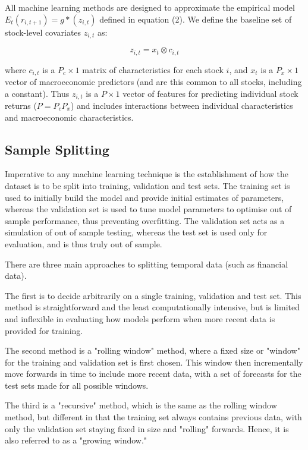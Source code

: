 \documentclass[a4paper, table]{article}
\newcommand{\smalltodo}[2][] {\todo[caption={#2}, size=\scriptsize,%
	fancyline,#1]{\begin{spacing}{.5}#2\end{spacing}}}
\newcommand{\rhs}[2][]{\smalltodo[color=green!30,#1]{{\bf RS:} #2}}
\begin{document}
All machine learning methods are designed to approximate the empirical model \( E_t(r_{i, t+1}) = g*(z_{i,t}) \) defined in equation (2). We define the baseline set of stock-level covariates \( z_{i,t} \) as:

\begin{equation}
\label{kronecker_equation}
z_{i,t} = x_t \otimes c_{i,t}
\end{equation}

where \( c_{i,t} \) is a \( P_c \times 1 \) matrix of characteristics for each stock \(i\), and \(x_t\) is a $P_x \times 1$ vector of macroeconomic predictors (and are this common to all stocks, including a constant). Thus $z_{i,t}$ is a $P \times 1$ vector of features for predicting individual stock returns ($P = P_cP_x$) and includes interactions between individual characteristics and macroeconomic characteristics. 

\subsection{Sample Splitting}
\label{sample_split}

\rhs{unclear, re-do slightly}

Imperative to any machine learning technique is the establishment of how the dataset is to be split into training, validation and test sets. The training set is used to initially build the model and provide initial estimates of parameters, whereas the validation set is used to tune model parameters to optimise out of sample performance, thus preventing overfitting. The validation set acts as a simulation of out of sample testing, whereas the test set is used only for evaluation, and is thus truly out of sample.

There are three main approaches to splitting temporal data (such as financial data). 

The first is to decide arbitrarily on a single training, validation and test set. This method is straightforward and the least computationally intensive, but is limited and inflexible in evaluating how models perform when more recent data is provided for training. 

The second method is a "rolling window" method, where a fixed size or "window" for the training and validation set is first chosen. This window then incrementally move forwards in time to include more recent data, with a set of forecasts for the test sets made for all possible windows.

The third is a "recursive" method, which is the same as the rolling window method, but different in that the training set always contains previous data, with only the validation set staying fixed in size and "rolling" forwards. Hence, it is also referred to as a "growing window."
\end{document}
